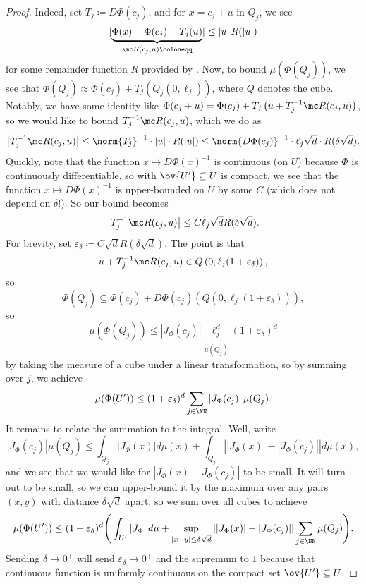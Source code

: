 \documentclass[../notes.tex]{subfiles}
\begin{document}
\begin{proof}
	Indeed, set $T_j\coloneqq D\Phi(c_j)$, and for $x=c_j+u$ in $Q_j$, we see
	\[\lvert\underbrace{\Phi(x)-\Phi(c_j)-T_j(u)}_{\mc R(c_j,u)\coloneqq}\rvert\le\left|u\right|R(\left|u\right|)\]
	for some remainder function $R$ provided by . Now, to bound $\mu(\Phi(Q_j))$, we see that $\Phi(Q_j)\approx\Phi(c_j)+T_j(Q_j(0,\ell_j))$, where $Q$ denotes the cube. Notably, we have some identity like $\Phi(c_j+u)=\Phi(c_j)+T_j\left(u+T_j^{-1}\mc R(c_j,u)\right)$, so we would like to bound $T_j^{-1}\mc R(c_j,u)$, which we do as
	\[\left|T_j^{-1}\mc R(c_j,u)\right|\le\norm{T_j}^{-1}\cdot\left|u\right|\cdot R(\left|u\right|)\le\norm{D\Phi(c_j)}^{-1}\cdot\ell_j\sqrt d\cdot R(\delta\sqrt d).\]
	Quickly, note that the function $x\mapsto D\Phi(x)^{-1}$ is continuous (on $U$) because $\Phi$ is continuously differentiable, so with $\ov{U'}\subseteq U$ is compact, we see that the function $x\mapsto D\Phi(x)^{-1}$ is upper-bounded on $U$ by some $C$ (which does not depend on $\delta$!). So our bound becomes
	\[\left|T_j^{-1}\mc R(c_j,u)\right|\le C\ell_j\sqrt dR(\delta\sqrt d).\]
	For brevity, set $\varepsilon_\delta\coloneqq C\sqrt dR(\delta\sqrt d)$. The point is that
	\[u+T_j^{-1}\mc R(c_j,u)\in Q\left(0,\ell_j(1+\varepsilon_\delta)\right),\]
	so
	\[\Phi(Q_j)\subseteq\Phi(c_j)+D\Phi(c_j)\left(Q\left(0,\ell_j(1+\varepsilon_\delta)\right)\right),\]
	so
	\[\mu(\Phi(Q_j))\le\left|J_\Phi(c_j)\right|\underbrace{\ell_j^d}_{\mu(Q_j)}\left(1+\varepsilon_\delta\right)^d\]
	by taking the measure of a cube under a linear transformation, so by summing over $j$, we achieve
	\[\mu(\Phi(U'))\le(1+\varepsilon_\delta)^d\sum_{j\in\NN}\left|J_\Phi(c_j)\right|\mu(Q_j).\]
	It remains to relate the summation to the integral. Well, write
	\[\left|J_\Phi(c_j)\right|\mu(Q_j)\le\int_{Q_j}\left|J_\Phi(x)\right|d\mu(x)+\int_{Q_j}\left|\left|J_\Phi(x)\right|-\left|J_\Phi(c_j)\right|\right|d\mu(x),\]
	and we see that we would like for $\left|J_\Phi(x)-J_\Phi(c_j)\right|$ to be small. It will turn out to be small, so we can upper-bound it by the maximum over any pairs $(x,y)$ with distance $\delta\sqrt d$ apart, so we sum over all cubes to achieve
	\[\mu(\Phi(U'))\le(1+\varepsilon_\delta)^d\Bigg(\int_{U'}\left|J_\Phi\right|d\mu+\sup_{\left|x-y\right|\le\delta\sqrt d}\left|\left|J_\Phi(x)\right|-\left|J_\Phi(c_j)\right|\right|\sum_{j\in\NN}\mu(Q_j)\Bigg).\]
	Sending $\delta\to0^+$ will send $\varepsilon_\delta\to0^+$ and the supremum to $1$ because that continuous function is uniformly continuous on the compact set $\ov{U'}\subseteq U$.
\end{proof}
\end{document}

